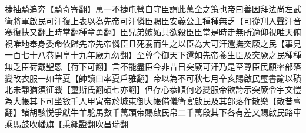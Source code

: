 捷抽騎追奔【騎奇寄翻】萬一不捷屯營自守臣謂此萬全之策也帝曰善因拜法尚左武衛將軍啟民可汗復上表以為先帝可汗憐臣賜臣安義公主種種無乏【可從刋入聲汗音寒復扶又翻上時掌翻種章勇翻】臣兄弟嫉妬共欲殺臣臣當是時走無所適仰視唯天俯視唯地奉身委命依歸先帝先帝憐臣且死養而生之以臣為大可汗還撫突厥之民【事見一百七十八卷開皇十九年厥九勿翻】至尊今御天下還如先帝養生臣及突厥之民種種無乏臣荷戴聖恩【荷下可翻】言不能盡臣今非昔日突厥可汗乃是至尊臣民願率部落變改衣服一如華夏【帥讀曰率夏戶雅翻】帝以為不可秋七月辛亥賜啟民璽書諭以磧北未靜猶須征戰【璽斯氏翻磧七亦翻】但存心恭順何必變服帝欲誇示突厥令宇文愷為大帳其下可坐數千人甲寅帝於城東御大帳備儀衛宴啟民及其部落作散樂【散昔亶翻】諸胡駭悦爭獻牛羊駝馬數千萬頭帝賜啟民帛二千萬段其下各有差又賜啟民路車乘馬鼓吹幡旗【乘繩證翻吹昌瑞翻
